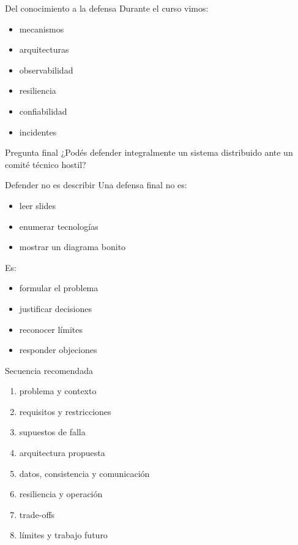 \documentclass[institutional,screen,none]{ua-engineering-v6-beamer}
\title{\UACourse}
\subtitle{Clase 16 --- Defensa final de sistema, objeciones y rúbrica}
\author{\UAProfessor}
\date{\UADate}
\begin{document}
{
\begin{frame}[plain]
\titlepage
\end{frame}
}


\begin{frame}{Del conocimiento a la defensa}
Durante el curso vimos:
\begin{itemize}
\item mecanismos
\item arquitecturas
\item observabilidad
\item resiliencia
\item confiabilidad
\item incidentes
\end{itemize}

\pause

\begin{block}{Pregunta final}
¿Podés defender integralmente un sistema distribuido ante un comité técnico hostil?
\end{block}
\end{frame}

\begin{frame}{Defender no es describir}
Una defensa final no es:
\begin{itemize}
\item leer slides
\item enumerar tecnologías
\item mostrar un diagrama bonito
\end{itemize}

\pause

Es:
\begin{itemize}
\item formular el problema
\item justificar decisiones
\item reconocer límites
\item responder objeciones
\end{itemize}
\end{frame}


\begin{frame}{Secuencia recomendada}
\begin{enumerate}
\item problema y contexto
\item requisitos y restricciones
\item supuestos de falla
\item arquitectura propuesta
\item datos, consistencia y comunicación
\item resiliencia y operación
\item trade-offs
\item límites y trabajo futuro
\end{enumerate}
\end{frame}
\end{document}
